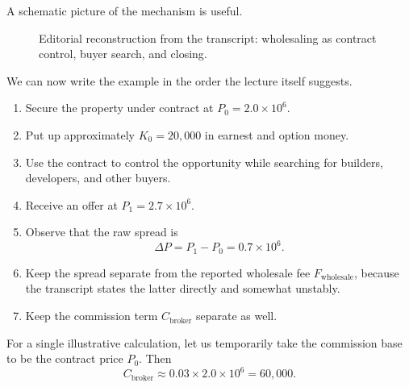 A schematic picture of the mechanism is useful.

\begin{figure}[h]
\centering
{}
\caption{Editorial reconstruction from the transcript: wholesaling as contract control, buyer search, and closing.}
\end{figure}

We can now write the example in the order the lecture itself suggests.
\begin{enumerate}
\item Secure the property under contract at \(P_0=2.0\times 10^6\).
\item Put up approximately \(K_0=20{,}000\) in earnest and option money.
\item Use the contract to control the opportunity while searching for builders, developers, and other buyers.
\item Receive an offer at \(P_1=2.7\times 10^6\).
\item Observe that the raw spread is
\[
\Delta P = P_1-P_0 = 0.7\times 10^6.
\]
\item Keep the spread separate from the reported wholesale fee \(F_{\mathrm{wholesale}}\), because the transcript states the latter directly and somewhat unstably.
\item Keep the commission term \(C_{\mathrm{broker}}\) separate as well.
\end{enumerate}

For a single illustrative calculation, let us temporarily take the commission base to be the contract price \(P_0\). Then
\begin{equation}
C_{\mathrm{broker}} \approx 0.03\times 2.0\times 10^6 = 60{,}000.
\end{equation}

